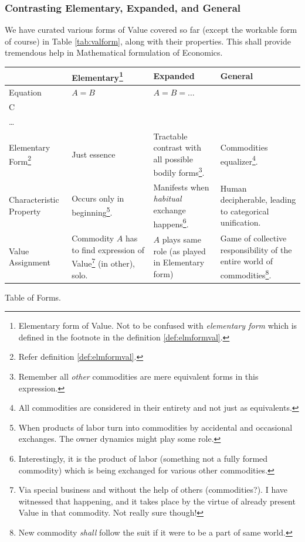 \documentclass[12pt]{extarticle}
\theoremstyle{definition}
\begin{document}
  \subsubsection{Contrasting Elementary,  Expanded, and General}
  We have curated various forms of Value covered so far (except the workable form of course) in Table \ref{tab:valform}, along with their properties.  This shall provide tremendous help in Mathematical formulation of Economics.
\begin{tabcontainer}
 \begin{tabularx}{\textwidth}{| X | X | X | X |}
 \hline
  & Elementary\footnote{Elementary form of Value.  Not to be confused with \emph{elementary form} which is defined in the footnote in the definition \ref{def:elmformval}.} & Expanded & General \\ [0.5ex] 
 \hline\hline
 Equation & \(
   A = B
 \) & \(A = B = \ldots\) &  \(
   \begin{rcases*} 
    B\\
    C\\
      \ldots
    \end{rcases*} = A\) \\
    Elementary Form\footnote{Refer definition \ref{def:elmformval}.} & Just essence & Tractable contrast with all possible bodily forms\footnote{Remember all \emph{other} commodities are mere equivalent forms in this expression.}.   & Commodities equalizer\footnote{All commodities are considered in their entirety and not just as equivalents.}.\\
    Characteristic Property & Occurs only in beginning\footnote{When products of labor turn into commodities by accidental and occasional exchanges.  The owner dynamics might play some role.}. &  Manifests when \emph{habitual} exchange happens\footnote{Interestingly, it is the product of labor (something not a fully formed commodity) which is being exchanged for various other commodities.}.  & Human decipherable, leading to categorical unification.\\
    Value Assignment & Commodity $A$ has to find expression of Value\footnote{Via special business and without the help of others (commodities?).  I have witnessed that happening, and it takes place by the virtue of already present Value in that commodity.  Not really sure though!} (in other), solo. & $A$ plays same role (as played in Elementary form)  & Game of collective responsibility of the entire world of commodities\footnote{New commodity \emph{shall} follow the suit if it were to be a part of same world.}.\\
    \hline
  \end{tabularx}
  \caption{Table of Forms.}
  \label{tab:valform}
\end{tabcontainer}
\end{document}
